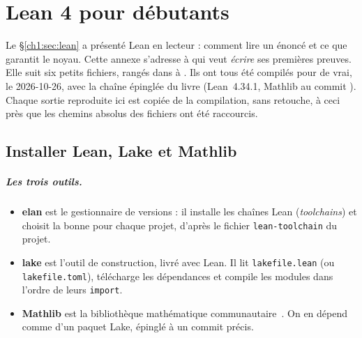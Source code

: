 \ifdefined\chemin\else
{}
\DeclareUrlCommand{}
\DeclareUrlCommand{}
\fi
\chapter{Lean 4 pour débutants}\label{appC:chap}

Le §\ref{ch1:sec:lean} a présenté Lean en lecteur : comment lire un énoncé et ce que garantit le noyau. Cette annexe
s'adresse à qui veut \emph{écrire} ses premières preuves. Elle suit six petits fichiers, rangés dans
 à . Ils ont tous été compilés pour de vrai,
le 2026-10-26, avec la chaîne épinglée du livre (Lean~4.34.1, Mathlib au commit
). Chaque sortie reproduite ici est copiée de la compilation, sans
retouche, à ceci près que les chemins absolus des fichiers ont été raccourcis.

\section{Installer Lean, Lake et Mathlib}\label{appC:sec:install}

\paragraph{Les trois outils.}
\begin{itemize}
\item \textbf{elan} est le gestionnaire de versions : il installe les chaînes Lean (\emph{toolchains}) et choisit la
bonne pour chaque projet, d'après le fichier \texttt{lean-toolchain} du projet.
\item \textbf{lake} est l'outil de construction, livré avec Lean. Il lit \texttt{lakefile.lean} (ou
\texttt{lakefile.toml}), télécharge les dépendances et compile les modules dans l'ordre de leurs \texttt{import}.
\item \textbf{Mathlib} est la bibliothèque mathématique communautaire~\cite{mathlib}. On en dépend comme d'un paquet
Lake, épinglé à un commit précis.
\end{itemize}

